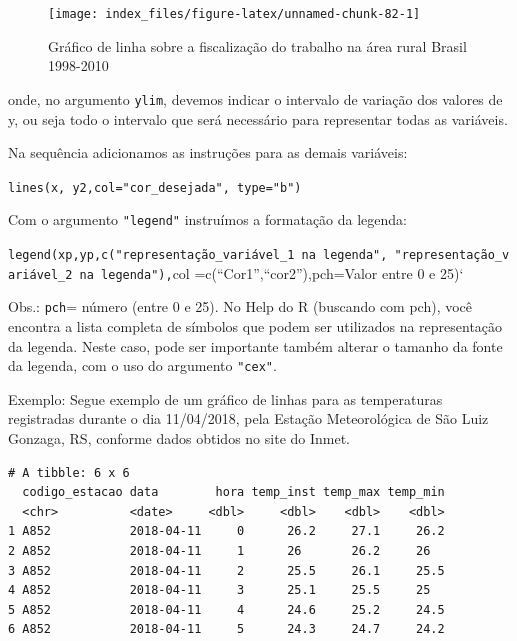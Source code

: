 \documentclass[12pt,brazil,oneside]{book}
\newenvironment{Shaded}{\begin{snugshade}}{\end{snugshade}}
\newcommand{\DataTypeTok}[1]{\textcolor[rgb]{0.13,0.29,0.53}{#1}}
\newcommand{\KeywordTok}[1]{\textcolor[rgb]{0.13,0.29,0.53}{\textbf{#1}}}
\newcommand{\NormalTok}[1]{#1}
\newcommand{\OtherTok}[1]{\textcolor[rgb]{0.56,0.35,0.01}{#1}}
\newcommand{\StringTok}[1]{\textcolor[rgb]{0.31,0.60,0.02}{#1}}
\begin{document}
\begin{figure}[H]

{\centering \texttt{[image: index\_files/figure-latex/unnamed-chunk-82-1]} 

}

\caption{Gráfico de linha sobre a fiscalização do trabalho na área rural Brasil 1998-2010}\label{fig:unnamed-chunk-82}
\end{figure}

onde, no argumento \texttt{ylim}, devemos indicar o intervalo de variação dos valores de y, ou seja todo o intervalo que será necessário para representar todas as variáveis.

Na sequência adicionamos as instruções para as demais variáveis:

\texttt{lines(x,\ y2,col="cor\_desejada",\ type="b")}

Com o argumento \texttt{"legend"} instruímos a formatação da legenda:

\texttt{legend(xp,yp,c("representação\_variável\_1\ na\ legenda",\ "representação\_variável\_2\ na\ legenda"),}col =c(``Cor1'',``cor2''),pch=Valor entre 0 e 25)`

Obs.: \texttt{pch}= número (entre 0 e 25). No Help do R (buscando com pch), você encontra a lista completa de símbolos que podem ser utilizados na representação da legenda.
Neste caso, pode ser importante também alterar o tamanho da fonte da legenda, com o uso do argumento \texttt{"cex"}.

Exemplo: Segue exemplo de um gráfico de linhas para as temperaturas registradas durante o dia 11/04/2018, pela Estação Meteorológica de São Luiz Gonzaga, RS, conforme dados obtidos no site do Inmet.

\begin{Shaded}
\end{Shaded}

\begin{verbatim}
# A tibble: 6 x 6
  codigo_estacao data        hora temp_inst temp_max temp_min
  <chr>          <date>     <dbl>     <dbl>    <dbl>    <dbl>
1 A852           2018-04-11     0      26.2     27.1     26.2
2 A852           2018-04-11     1      26       26.2     26  
3 A852           2018-04-11     2      25.5     26.1     25.5
4 A852           2018-04-11     3      25.1     25.5     25  
5 A852           2018-04-11     4      24.6     25.2     24.5
6 A852           2018-04-11     5      24.3     24.7     24.2
\end{verbatim}
\end{document}
